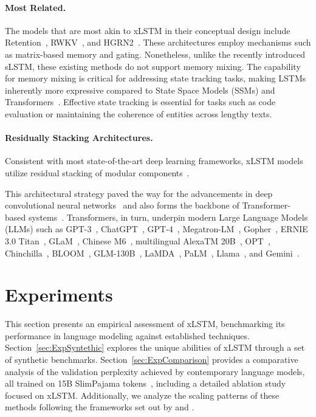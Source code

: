 \paragraph{Most Related.} The models that are most akin to xLSTM in their conceptual design include Retention~\citep{Sun:23arxiv}, RWKV~\citep{Peng:23arxivshort,Peng:24arxivshort}, and HGRN2~\citep{Qin:24arxiv}. These architectures employ mechanisms such as matrix-based memory and gating. Nonetheless, unlike the recently introduced sLSTM, these existing methods do not support memory mixing. The capability for memory mixing is critical for addressing state tracking tasks, making LSTMs inherently more expressive compared to State Space Models (SSMs) and Transformers~\citep{Merrill:24,Deletang:23}. Effective state tracking is essential for tasks such as code evaluation or maintaining the coherence of entities across lengthy texts.

\paragraph{Residually Stacking Architectures.} Consistent with most state-of-the-art deep learning frameworks, xLSTM models utilize residual stacking of modular components~\citep{Srivastava:15,He:16}.

This architectural strategy paved the way for the advancements in deep convolutional neural networks~\citep{He:16} and also forms the backbone of Transformer-based systems~\citep{Vaswani:17}. Transformers, in turn, underpin modern Large Language Models (LLMs) such as GPT-3~\citep{Brown:20short}, ChatGPT~\citep{Schulman:22short}, GPT-4~\citep{Achiam:23gpt4short}, Megatron-LM~\citep{Shoeybi:19}, Gopher~\citep{Rae:21short}, ERNIE 3.0 Titan~\citep{Wang:21arxivshort}, GLaM~\citep{Du:21glamshort}, Chinese M6~\citep{Lin:21}, multilingual AlexaTM 20B~\citep{Soltan:22}, OPT~\citep{Zhang:22opt}, Chinchilla~\citep{Hoffmann:22short}, BLOOM~\citep{Scao:22arxivshort}, GLM-130B~\citep{Zeng:22arxivshort}, LaMDA~\citep{Thoppilan:22short}, PaLM~\citep{Chowdhery:22short}, Llama~\citep{Touvron:23arxiv}, and Gemini~\citep{GeminiTeam:23arxiv,Reid:24arxiv}.

\section{Experiments}
\label{sec:Exp}

This section presents an empirical assessment of xLSTM, benchmarking its performance in language modeling against established techniques. Section~\ref{sec:ExpSyntethic} explores the unique abilities of xLSTM through a set of synthetic benchmarks. Section~\ref{sec:ExpComparison} provides a comparative analysis of the validation perplexity achieved by contemporary language models, all trained on 15B SlimPajama tokens~\citep{Soboleva:23}, including a detailed ablation study focused on xLSTM. Additionally, we analyze the scaling patterns of these methods following the frameworks set out by \citet{Kaplan:20} and \citet{Brown:20short}. 

